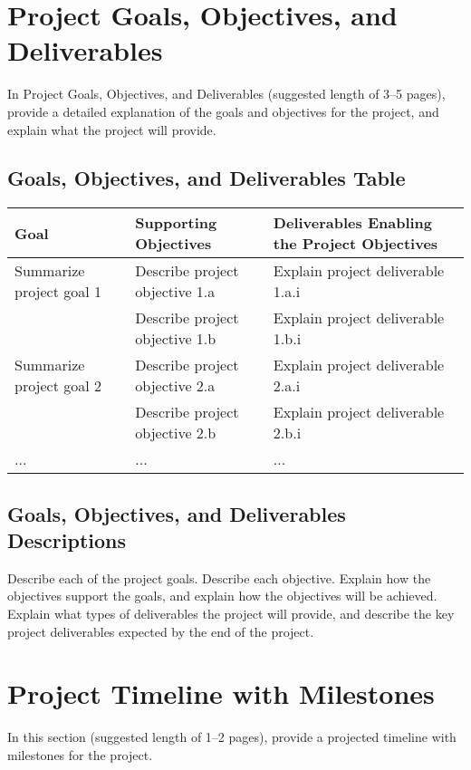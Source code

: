 \documentclass[12pt]{report}
\begin{document}
\chapter*{Project Goals, Objectives, and Deliverables}
In Project Goals, Objectives, and Deliverables (suggested length of 3–5 pages), provide a detailed explanation of the goals and objectives for the project, and explain what the project will provide.

\section*{Goals, Objectives, and Deliverables Table}

\begin{tabular}{|l|l|l|}
\hline
Goal & Supporting Objectives & Deliverables Enabling the Project Objectives \\
\hline
Summarize project goal 1 & Describe project objective 1.a & Explain project deliverable 1.a.i \\
 & Describe project objective 1.b & Explain project deliverable 1.b.i \\
\hline
Summarize project goal 2 & Describe project objective 2.a & Explain project deliverable 2.a.i \\
 & Describe project objective 2.b & Explain project deliverable 2.b.i \\
\hline
... & ... & ... \\
\hline
\end{tabular}

\section*{Goals, Objectives, and Deliverables Descriptions}
Describe each of the project goals. Describe each objective. Explain how the objectives support the goals, and explain how the objectives will be achieved. Explain what types of deliverables the project will provide, and describe the key project deliverables expected by the end of the project.

\chapter*{Project Timeline with Milestones}
In this section (suggested length of 1–2 pages), provide a projected timeline with milestones for the project. 
\end{document}
